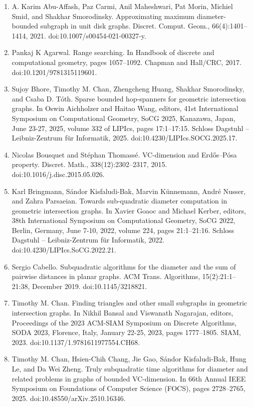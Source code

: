 \begin{enumerate}
\item[]  [1]  A. Karim Abu-Affash, Paz Carmi, Anil Maheshwari, Pat Morin, Michiel Smid, and Shakhar Smorodinsky.  Approximating maximum diameter-bounded subgraph in unit disk graphs.  Discret. Comput. Geom., 66(4):1401–1414, 2021.  doi:10.1007/s00454-021-00327-y.  
\item[]  [2]  Pankaj K Agarwal.  Range searching.  In Handbook of discrete and computational geometry, pages 1057–1092. Chapman and Hall/CRC, 2017.  doi:10.1201/9781315119601.  
\item[]  [3]  Sujoy Bhore, Timothy M. Chan, Zhengcheng Huang, Shakhar Smorodinsky, and Csaba D. Tóth.  Sparse bounded hop-spanners for geometric intersection graphs.  In Oswin Aichholzer and Haitao Wang, editors, 41st International Symposium on Computational Geometry, SoCG 2025, Kanazawa, Japan, June 23-27, 2025, volume 332 of LIPIcs, pages 17:1–17:15. Schloss Dagstuhl – Leibniz-Zentrum für Informatik, 2025.  doi:10.4230/LIPIcs.SOCG.2025.17.  
\item[]  [4]  Nicolas Bousquet and Stéphan Thomassé.  VC-dimension and Erdős–Pósa property.  Discret. Math., 338(12):2302–2317, 2015.  doi:10.1016/j.disc.2015.05.026.  
\item[]  [5]  Karl Bringmann, Sándor Kisfaludi-Bak, Marvin Künnemann, André Nusser, and Zahra Parsaeian.  Towards sub-quadratic diameter computation in geometric intersection graphs.  In Xavier Goaoc and Michael Kerber, editors, 38th International Symposium on Computational Geometry, SoCG 2022, Berlin, Germany, June 7-10, 2022, volume 224, pages 21:1–21:16. Schloss Dagstuhl – Leibniz-Zentrum für Informatik, 2022.  doi:10.4230/LIPIcs.SoCG.2022.21.  
\item[]  [6]  Sergio Cabello.  Subquadratic algorithms for the diameter and the sum of pairwise distances in planar graphs.  ACM Trans. Algorithms, 15(2):21:1–21:38, December 2019.  doi:10.1145/3218821.  
\item[]  [7]  Timothy M. Chan.  Finding triangles and other small subgraphs in geometric intersection graphs.  In Nikhil Bansal and Viswanath Nagarajan, editors, Proceedings of the 2023 ACM-SIAM Symposium on Discrete Algorithms, SODA 2023, Florence, Italy, January 22-25, 2023, pages 1777–1805. SIAM, 2023.  doi:10.1137/1.9781611977554.CH68.  
\item[]  [8]  Timothy M. Chan, Hsien-Chih Chang, Jie Gao, Sándor Kisfaludi-Bak, Hung Le, and Da Wei Zheng.  Truly subquadratic time algorithms for diameter and related problems in graphs of bounded VC-dimension.  In 66th Annual IEEE Symposium on Foundations of Computer Science (FOCS), pages 2728–2765, 2025.  doi:10.48550/arXiv.2510.16346.  

\end{enumerate}
